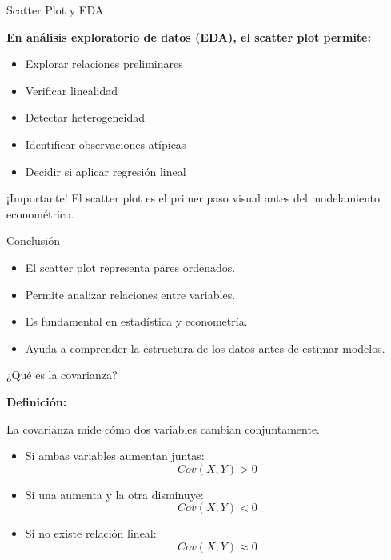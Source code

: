 \documentclass{beamer}
\begin{document}
\begin{frame}{Scatter Plot y EDA}

\textbf{En análisis exploratorio de datos (EDA), el scatter plot permite:}

\vspace{0.3cm}

\begin{itemize}
\item Explorar relaciones preliminares
\item Verificar linealidad
\item Detectar heterogeneidad
\item Identificar observaciones atípicas
\item Decidir si aplicar regresión lineal
\end{itemize}

\vspace{0.4cm}

\begin{block}{¡Importante!}
El scatter plot es el primer paso visual antes del modelamiento econométrico.
\end{block}

\end{frame}

\begin{frame}{Conclusión}

\begin{itemize}
\item El scatter plot representa pares ordenados.
\item Permite analizar relaciones entre variables.
\item Es fundamental en estadística y econometría.
\item Ayuda a comprender la estructura de los datos antes de estimar modelos.
\end{itemize}

\end{frame}

\begin{frame}{¿Qué es la covarianza?}

\textbf{Definición:}

La covarianza mide cómo dos variables cambian conjuntamente.

\vspace{0.4cm}

\begin{itemize}
\item Si ambas variables aumentan juntas:
\[
Cov(X,Y)>0
\]

\item Si una aumenta y la otra disminuye:
\[
Cov(X,Y)<0
\]

\item Si no existe relación lineal:
\[
Cov(X,Y)\approx0
\]
\end{itemize}

\end{frame}
\end{document}
